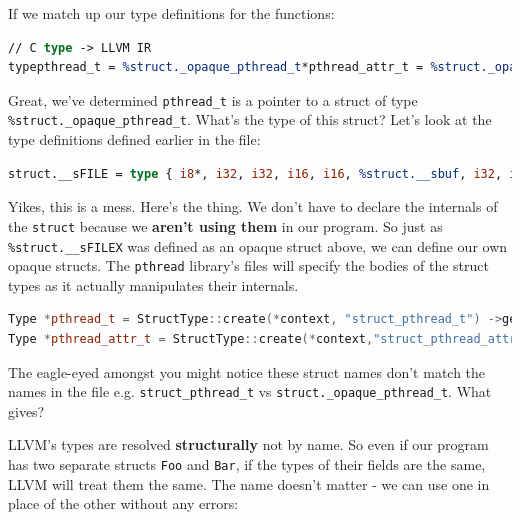If we match up our type definitions for the functions:


\begin{lstlisting}[language=llvm]
// C type -> LLVM IR 
typepthread_t = %struct._opaque_pthread_t*pthread_attr_t = %struct._opaque_pthread_attr_t
\end{lstlisting}

Great, we've determined \texttt{pthread\_t} is a pointer to a struct of
type \texttt{\%struct.\_opaque\_pthread\_t}. What's the type of this
struct? Let's look at the type definitions defined earlier in the file:


\begin{lstlisting}[language=llvm]
struct.__sFILE = type { i8*, i32, i32, i16, i16, %struct.__sbuf, i32, i8*, i32(i8*)*, i32 (i8*, i8*, i32)*, i64 (i8*, i64, i32)*, i32 (i8*, i8*, i32)*, %struct.__sbuf, %struct.__sFILEX*, i32, [3 x i8], [1 x i8], %struct.__sbuf, i32, i64 }%struct.__sFILEX = type opaque%struct.__sbuf = type { i8*, i32 }%struct._opaque_pthread_t = type { i64, %struct.__darwin_pthread_handler_rec*, [8176 x i8] }%struct.__darwin_pthread_handler_rec = type { void (i8*)*, i8*, %struct.__darwin_pthread_handler_rec* }%struct._opaque_pthread_attr_t = type { i64, [56 x i8] }
\end{lstlisting}

Yikes, this is a mess. Here's the thing. We don't have to declare the
internals of the \texttt{struct} because we \textbf{aren't using them}
in our program. So just as \texttt{\%struct.\_\_sFILEX} was defined as
an opaque struct above, we can define our own opaque structs. The
\texttt{pthread} library's files will specify the bodies of the struct
types as it actually manipulates their internals.


\begin{lstlisting}[language=C++]
Type *pthread_t = StructType::create(*context, "struct_pthread_t") ->getPointerTo();
Type *pthread_attr_t = StructType::create(*context,"struct_pthread_attr_t")
\end{lstlisting}

The eagle-eyed amongst you might notice these struct names don't match
the names in the file e.g. \texttt{struct\_pthread\_t} vs
\texttt{struct.\_opaque\_pthread\_t}. What gives?

LLVM's types are resolved \textbf{structurally} not by name. So even if
our program has two separate structs \texttt{Foo} and \texttt{Bar}, if
the types of their fields are the same, LLVM will treat them the same.
The name doesn't matter - we can use one in place of the other without
any errors:

